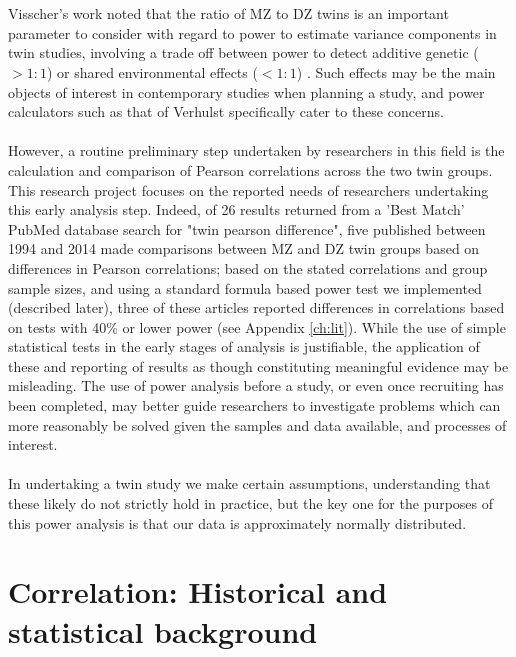 \\
\\
Visscher's work noted that the ratio of MZ to DZ twins is an important parameter to consider with regard to power to estimate variance components in twin studies, involving a trade off between power to detect additive genetic ($>1:1$) or shared environmental effects ($<1:1$) \cite{Visscher2008a}.  Such effects may be the main objects of interest in contemporary studies when planning a study, and power calculators such as that of Verhulst \cite{Verhulst2017} specifically cater to these concerns.  
\\
\\
However, a routine preliminary step undertaken by researchers in this field is the calculation and comparison of Pearson correlations across the two twin groups.  This research project focuses on the reported needs of researchers undertaking this early analysis step.  Indeed, of 26 results returned from a 'Best Match' PubMed database search for "twin pearson difference", five published between 1994 and 2014 made comparisons between MZ and DZ twin groups based on differences in Pearson correlations; based on the stated correlations and group sample sizes, and using a standard formula based power test we implemented (described later), three of these articles reported differences in correlations based on tests with 40\% or lower power (see Appendix \ref{ch:lit}).  While the use of simple statistical tests in the early stages of analysis is justifiable, the application of these and reporting of results as though constituting meaningful evidence may be misleading.  The use of power analysis before a study, or even once recruiting has been completed, may better guide researchers to investigate problems which can more reasonably be solved given the samples and data available, and processes of interest.
\\
\\
In undertaking a twin study we make certain assumptions, understanding that these likely do not strictly hold in practice, but the key one for the purposes of this power analysis is that our data is approximately normally distributed.

\section{Correlation: Historical and statistical background}
